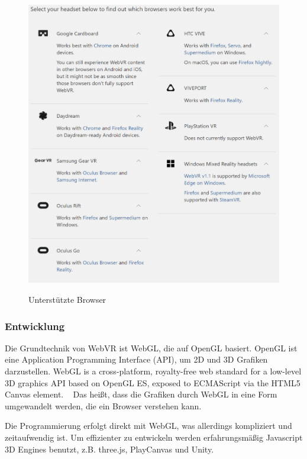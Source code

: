 \begin{figure}[ht]
\vspace*{1em}
\centering
\caption{Unterstützte Browser}
\includegraphics[width=\textwidth]{images/supportedBrowsers.png}
\label{fig:supportedBrowsers} 
\end{figure}
 
  \subsubsection{Entwicklung}
 Die Grundtechnik von WebVR ist WebGL, die auf OpenGL basiert. OpenGL ist eine Application Programming Interface (API), um 2D und 3D Grafiken darzustellen. \glqq WebGL is a cross-platform, royalty-free web standard for a low-level 3D graphics API based on OpenGL ES, exposed to ECMAScript via the HTML5 Canvas element. \grqq\ \citep{23} Das heißt, dass die Grafiken durch WebGL in eine Form umgewandelt werden, die ein Browser verstehen kann. 
 
 Die Programmierung erfolgt direkt mit WebGL, was allerdings kompliziert und zeitaufwendig ist. Um effizienter zu entwickeln werden erfahrungsmäßig Javascript 3D Engines benutzt, z.B. three.js, PlayCanvas und Unity.
 
